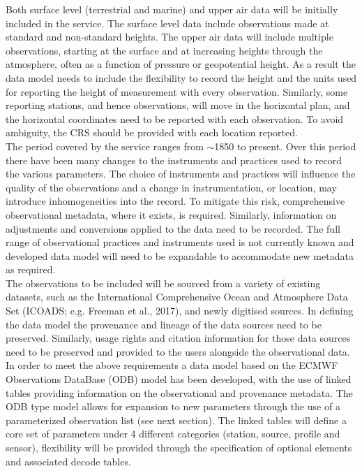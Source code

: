 \documentclass[a4paper,11pt]{article}
\begin{document}
Both surface level (terrestrial and marine) and upper air data will be initially included in the service. The surface level data include observations made at standard and non-standard heights. The upper air data will include multiple observations, starting at the surface and at increasing heights through the atmosphere, often as a function of pressure or geopotential height. As a result the data model needs to include the flexibility to record the height and the units used for reporting the height of measurement with every observation. Similarly, some reporting stations, and hence observations, will move in the horizontal plan, and the horizontal coordinates need to be reported with each observation. To avoid ambiguity, the CRS should be provided with each location reported.\\

The period covered by the service ranges from $\sim$1850 to present. Over this period there have been many changes to the instruments and practices used to record the various parameters. The choice of instruments and practices will influence the quality of the observations and a change in instrumentation, or location, may introduce inhomogeneities into the record. To mitigate this risk, comprehensive observational metadata, where it exists, is required. Similarly, information on adjustments and conversions applied to the data need to be recorded. The full range of observational practices and instruments used is not currently known and developed data model will need to be expandable to accommodate new metadata as required.\\

The observations to be included will be sourced from a variety of existing datasets, such as the International Comprehensive Ocean and Atmosphere Data Set (ICOADS; e.g. Freeman et al., 2017), and newly digitised sources. In defining the data model the provenance and lineage of the data sources need to be preserved. Similarly, usage rights and citation information for those data sources need to be preserved and provided to the users alongside the observational data.\\

In order to meet the above requirements a data model based on the ECMWF Observations DataBase (ODB) model has been developed, with the use of linked tables providing information on the observational and provenance metadata. The ODB type model allows for expansion to new parameters through the use of a parameterized observation list (see next section). The linked tables will define a core set of parameters under 4 different categories (station, source, profile and sensor), flexibility will be provided through the specification of optional elements and associated decode tables.\\
\end{document}
